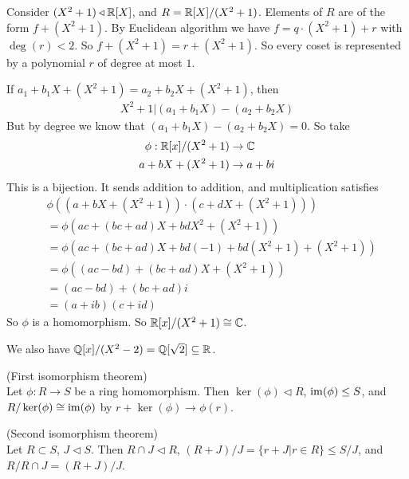 \documentclass[a4paper]{article}
\begin{document}
\begin{eg}
Consider $(X^2+1) \triangleleft \mathbb{R}[X]$, and $R=\mathbb{R}[X]/(X^2+1)$. Elements of $R$ are of the form $f+(X^2+1)$. By Euclidean algorithm we have $f=q\cdot (X^2+1) + r$ with $\deg(r) < 2$. So $f+(X^2+1) = r + (X^2+1)$. So every coset is represented by a polynomial $r$ of degree at most $1$.

If $a_1+b_1X + (X^2+1) = a_2+b_2X + (X^2+1)$, then
\begin{equation*}
\begin{aligned}
X^2+1 | (a_1+b_1X)-(a_2+b_2X)
\end{aligned}
\end{equation*}
But by degree we know that $(a_1+b_1X) - (a_2+b_2X) = 0$. So take
\begin{equation*}
\begin{aligned}
\phi:\mathbb{R}[x]/(X^2+1) &\to \mathbb{C}\\
a+bX+(X^2+1) &\to a+bi
\end{aligned}
\end{equation*}
This is a bijection. It sends addition to addition, and multiplication satisfies
\begin{equation*}
\begin{aligned}
&\phi((a+bX+(X^2+1)) \cdot (c+dX+(X^2+1)))\\
&=\phi(ac+(bc+ad)X + bdX^2 + (X^2+1))\\
&=\phi(ac+(bc+ad)X + bd(-1) + bd(X^2+1) + (X^2+1))\\
&=\phi((ac-bd) + (bc+ad)X + (X^2+1))\\
&=(ac-bd)+(bc+ad)i\\
&=(a+ib)(c+id)
\end{aligned}
\end{equation*}
So $\phi$ is a homomorphism. So $\mathbb{R}[x] / (X^2+1) \cong \mathbb{C}$.
\end{eg}

We also have $\mathbb{Q}[x]/(X^2-2) = \mathbb{Q}[\sqrt{2}] \subseteq \mathbb{R}$.

\begin{thm} (First isomorphism theorem)\\
Let $\phi:R \to S$ be a ring homomorphism. Then $\ker(\phi) \triangleleft R$, $\operatorname{im}(\phi) \leq S$, and $R/\ker(\phi) \cong \operatorname{im}(\phi)$ by $r+\ker(\phi) \to \phi(r)$.
\end{thm}

\begin{thm} (Second isomorphism theorem)\\
Let $R \subset S$, $J \triangleleft S$. Then $R\cap J \triangleleft R$, $(R+J)/J = \{r+J | r \in R\} \leq S/J$, and $R / R\cap J = (R+J)/J$.
\end{thm}
\end{document}
